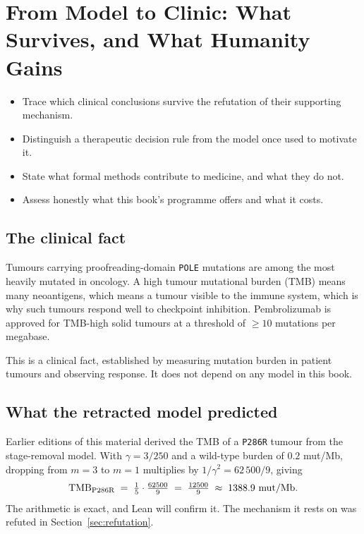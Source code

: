 \section{From Model to Clinic: What Survives, and What Humanity Gains}\label{sec:clinic}

\begin{objectives}
\begin{itemize}[leftmargin=*,itemsep=1pt,topsep=1pt]
  \item Trace which clinical conclusions survive the refutation of their supporting mechanism.
  \item Distinguish a therapeutic decision rule from the model once used to motivate it.
  \item State what formal methods contribute to medicine, and what they do not.
  \item Assess honestly what this book's programme offers and what it costs.
\end{itemize}
\end{objectives}

\subsection{The clinical fact}

Tumours carrying proofreading-domain \texttt{POLE} mutations are among the most
heavily mutated in oncology. A high tumour mutational burden (TMB) means many
neoantigens, which means a tumour visible to the immune system, which is why
such tumours respond well to checkpoint inhibition. Pembrolizumab is approved
for TMB-high solid tumours at a threshold of $\ge 10$ mutations per megabase.

This is a clinical fact, established by measuring mutation burden in patient
tumours and observing response. It does not depend on any model in this book.

\subsection{What the retracted model predicted}

Earlier editions of this material derived the TMB of a \texttt{P286R} tumour from
the stage-removal model. With $\gamma = 3/250$ and a wild-type burden of
$0.2$ mut/Mb, dropping from $m = 3$ to $m = 1$ multiplies by $1/\gamma^{2} =
62\,500/9$, giving
\begin{equation}\label{eq:tmbpred}
  \mathrm{TMB}_{\text{P286R}} \;=\; \tfrac{1}{5}\cdot\tfrac{62500}{9} \;=\; \tfrac{12500}{9} \;\approx\; 1388.9 \ \text{mut/Mb}.
\end{equation}
The arithmetic is exact, and Lean will confirm it. The mechanism it rests on was
refuted in Section~\ref{sec:refutation}.

